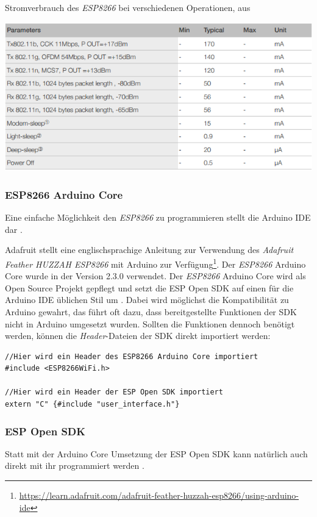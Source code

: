 \begin{table}[h]
  \centering
  \caption{Stromverbrauch des \emph{ESP8266} bei verschiedenen Operationen, aus \cite{espressif2017esp8266}}
	\includegraphics[width=\textwidth]{images/esppower.png}
  \label{table:esppower}
\end{table}


\subsubsection{ESP8266 Arduino Core}
Eine einfache Möglichkeit den \emph{ESP8266} zu programmieren stellt die Arduino IDE dar \cite{banzi2017arduino}.

Adafruit stellt eine englischsprachige Anleitung zur Verwendung des \textit{Adafruit Feather HUZZAH ESP8266} mit Arduino zur Verfügung\footnote{\url{https://learn.adafruit.com/adafruit-feather-huzzah-esp8266/using-arduino-ide}}.
Der \emph{ESP8266} Arduino Core wurde in der Version 2.3.0 verwendet.
Der \emph{ESP8266} Arduino Core wird als Open Source Projekt gepflegt und setzt die ESP Open SDK auf einen für die Arduino IDE üblichen Stil um \cite{arduino2017core}. 
Dabei wird möglichst die Kompatibilität zu Arduino gewahrt, das führt oft dazu, dass bereitgestellte Funktionen der SDK nicht in Arduino umgesetzt wurden.
Sollten die Funktionen dennoch benötigt werden, können die \emph{Header}-Dateien der SDK direkt importiert werden:

\begin{verbatim}
//Hier wird ein Header des ESP8266 Arduino Core importiert
#include <ESP8266WiFi.h> 

//Hier wird ein Header der ESP Open SDK importiert
extern "C" {#include "user_interface.h"} 
\end{verbatim}

\subsubsection{ESP Open SDK}
Statt mit der Arduino Core Umsetzung der ESP Open SDK kann natürlich auch direkt mit ihr programmiert werden \cite{esp2017open}. 

